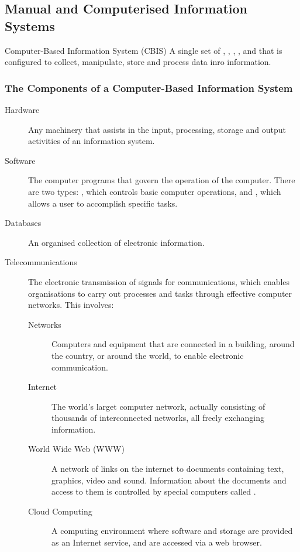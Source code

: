 \documentclass[\main/notes.tex]{subfiles}
\begin{document}
			\subsection{Manual and Computerised Information Systems}
				\begin{definition}{Computer-Based Information System (CBIS)}
					A single set of , , , ,  and  that is configured to collect, manipulate, store and process data inro information. 
				\end{definition}
				\subsubsection*{The Components of a Computer-Based Information System}
					\begin{description}
						\item[Hardware] Any machinery that assists in the input, processing, storage and output activities of an information system. 
						\item[Software] The computer programs that govern the operation of the computer. There are two types: , which controls basic computer operations, and , which allows a user to accomplish specific tasks.
						\item[Databases] An organised collection of electronic information.
						\item[Telecommunications] The electronic transmission of signals for communications, which enables organisations to carry out processes and tasks through effective computer networks. This involves:
							\begin{description}
								\item[Networks] Computers and equipment that are connected in a building, around the country, or around the world, to enable electronic communication.
								\item[Internet] The world's larget computer network, actually consisting of thousands of interconnected networks, all freely exchanging information.
								\item[World Wide Web (WWW)] A network of links on the internet to documents containing text, graphics, video and sound. Information about the documents and access to them is controlled by special computers called .
								\item[Cloud Computing] A computing environment where software and storage are provided as an Internet service, and are accessed via a web browser.

\end{description}
\end{description}
\end{document}
